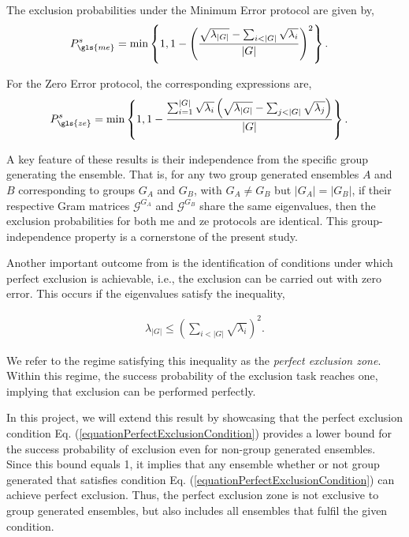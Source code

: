 \documentclass[12pt,letterpaper]{article}
\begin{document}
The exclusion probabilities under the Minimum Error protocol are given by,
\begin{align*}
	P_{\gls{me}}^s &= \min\left\{ 1, 1 - \left( \frac{ \sqrt{\lambda_{|G|}} - \sum_{i<|G|} \sqrt{\lambda_i} }{|G|} \right)^2 \right\}.
\end{align*}

For the Zero Error protocol, the corresponding expressions are,
\begin{align*}
	P_{\gls{ze}}^s &= \min\left\{ 1, 1 - \frac{ \sum_{i=1}^{|G|} \sqrt{\lambda_i} \left( \sqrt{\lambda_{|G|}} - \sum_{j<|G|} \sqrt{\lambda_j} \right) }{|G|} \right\}.
\end{align*}

A key feature of these results is their independence from the specific group generating the ensemble. That is, for any two group generated ensembles $A$ and $B$ corresponding to groups $G_A$ and $G_B$, with $G_A \neq G_B$ but $|G_A| = |G_B|$, if their respective Gram matrices $\mathcal{G}^{G_A}$ and $\mathcal{G}^{G_B}$ share the same eigenvalues, then the exclusion probabilities for both \gls{me} and \gls{ze} protocols are identical. This group-independence property is a cornerstone of the present study.

Another important outcome from \cite{MainPaper} is the identification of conditions under which perfect exclusion is achievable, i.e., the exclusion can be carried out with zero error. This occurs if the eigenvalues satisfy the inequality,

\begin{align}\label{equationPerfectExclusionCondition}
	\lambda_{|G|} \leq \left( \sum_{i<|G|} \sqrt{\lambda_i} \right)^2.
\end{align}

We refer to the regime satisfying this inequality as the \emph{perfect exclusion zone}. Within this regime, the success probability of the exclusion task reaches one, implying that exclusion can be performed perfectly.

In this project, we will extend this result by showcasing that the perfect exclusion condition Eq. (\ref{equationPerfectExclusionCondition}) provides a lower bound for the success probability of exclusion even for non-group generated ensembles. Since this bound equals 1, it implies that any ensemble whether or not group generated that satisfies condition Eq. (\ref{equationPerfectExclusionCondition}) can achieve perfect exclusion. Thus, the perfect exclusion zone is not exclusive to group generated ensembles, but also includes all ensembles that fulfil the given condition.
\end{document}
